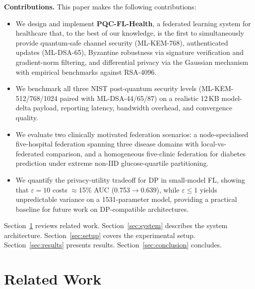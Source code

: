 \documentclass[conference]{IEEEtran}
\begin{document}
\textbf{Contributions.} This paper makes the following contributions:
\begin{itemize}
  \item We design and implement \textbf{PQC-FL-Health}, a federated
    learning system for healthcare that, to the best of our knowledge,
    is the first to simultaneously provide quantum-safe channel security
    (ML-KEM-768), authenticated updates (ML-DSA-65), Byzantine
    robustness via signature verification and gradient-norm filtering,
    and differential privacy via the Gaussian mechanism with empirical
    benchmarks against RSA-4096.

  \item We benchmark all three NIST post-quantum security levels
    (ML-KEM-512/768/1024 paired with ML-DSA-44/65/87) on a realistic
    12\,KB model-delta payload, reporting latency, bandwidth overhead,
    and convergence quality.

  \item We evaluate two clinically motivated federation scenarios:
    a node-specialised five-hospital federation spanning three disease
    domains with local-vs-federated comparison, and a homogeneous
    five-clinic federation for diabetes prediction under extreme
    non-IID glucose-quartile partitioning.

  \item We quantify the privacy-utility tradeoff for DP in small-model
    FL, showing that $\varepsilon = 10$ costs $\approx$15\% AUC
    (0.753$\to$0.639), while $\varepsilon \le 1$ yields unpredictable
    variance on a 1531-parameter model, providing a practical baseline
    for future work on DP-compatible architectures.
\end{itemize}

Section~\ref{sec:related} reviews related work.
Section~\ref{sec:system} describes the system architecture.
Section~\ref{sec:setup} covers the experimental setup.
Section~\ref{sec:results} presents results.
Section~\ref{sec:conclusion} concludes.

\section{Related Work}
\label{sec:related}
\end{document}
